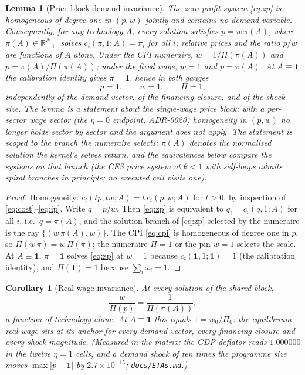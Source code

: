 \documentclass[11pt]{article}
\newtheorem{lemma}{Lemma}
\newtheorem{corollary}{Corollary}
\numberwithin{equation}{section}
\newcommand{\one}{\mathbf{1}}
\begin{document}
\begin{lemma}[Price block demand-invariance]\label{lem:price}
The zero-profit system \eqref{eq:zp} is homogeneous of degree one in
$(p,w)$ jointly and contains no demand variable. Consequently, for any
technology $A$, every solution satisfies $p = w\,\pi(A)$, where
$\pi(A) \in \mathbb{R}^N_{++}$ solves $c_i(\pi,1;A) = \pi_i$ for all $i$;
relative prices and the ratio $p/w$ are functions of $A$ alone. Under the
CPI numeraire, $w = 1/\Pi(\pi(A))$ and $p = \pi(A)/\Pi(\pi(A))$; under the
fixed wage, $w = 1$ and $p = \pi(A)$. At $A \equiv \one$ the calibration
identity gives $\pi = \one$, hence in both gauges
\begin{equation}
p = \one, \qquad w = 1, \qquad \Pi = 1,
\end{equation}
independently of the demand vector, of the financing closure, and of the
shock size. \textcolor{revisionV1}{The lemma is a statement about the
\emph{single-wage} price block: with a per-sector wage vector (the
$\eta = 0$ endpoint, ADR-0020) homogeneity in $(p, w)$ no longer holds
sector by sector and the argument does not apply.}
\textcolor{revisionV3}{The statement is scoped to the branch the numeraire
selects: $\pi(A)$ denotes the normalised solution the kernel's solves return,
and the equivalences below compare the systems on that branch (the CES price
system at $\theta<1$ with self-loops admits spiral branches in principle; no
executed cell visits one).}
\end{lemma}

\begin{proof}
Homogeneity: $c_i(tp, tw; A) = t\, c_i(p,w;A)$ for $t>0$, by inspection of
\eqref{eq:cost}--\eqref{eq:ip}. Write $q = p/w$. Then \eqref{eq:zp} is
equivalent to $q_i = c_i(q,1;A)$ for all $i$, i.e.\ $q = \pi(A)$, and
\textcolor{revisionV3}{the solution branch of \eqref{eq:zp} selected by the
numeraire is the ray} $\{(w\,\pi(A), w)\}$. The
CPI \eqref{eq:cpi} is homogeneous of degree one in $p$, so
$\Pi(w\,\pi) = w\,\Pi(\pi)$; the numeraire $\Pi = 1$ or the pin $w = 1$
selects the scale. At $A \equiv \one$, $\pi = \one$ solves
\eqref{eq:zp} at $w = 1$ because $c_i(\one,1;\one) = 1$ (the calibration
identity), and $\Pi(\one) = 1$ because $\sum_i \omega_i = 1$.
\end{proof}

\begin{corollary}[Real-wage invariance]\label{cor:realwage}
At every solution of the shared block,
\begin{equation}
\frac{w}{\Pi(p)} = \frac{1}{\Pi(\pi(A))},
\end{equation}
a function of technology alone. At $A \equiv \one$ this equals $1 =
w_0/\Pi_0$: the equilibrium real wage sits at its anchor for every demand
vector, every financing closure and every shock magnitude. (Measured in the
matrix: the GDP deflator reads $1.000000$ in \textcolor{revisionV1}{the
twelve $\eta = 1$ cells}, and a demand
shock of ten times the programme size moves $\max|p-\one|$ by
$2.7\times10^{-15}$; \texttt{docs/ETAs.md}.)
\end{corollary}
\end{document}
